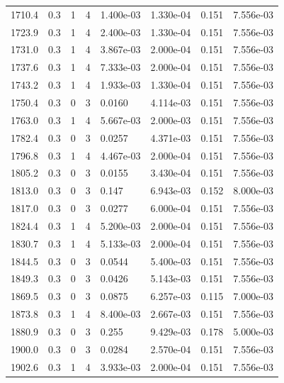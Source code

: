 \documentclass[preview]{standalone}
\begin{document}
{{{{{{\begin{tabular}{L{1.2cm}C{1.2cm} C{0.3cm}C{0.5cm} C{1.4cm}C{1.4cm} C{1.4cm}C{1.4cm}}
  1710.4  &   0.3  & 1     &  4 &  1.400e-03  & 1.330e-04  & 0.151 &  7.556e-03   \\ 
  1723.9  &   0.3  & 1     &  4 &  2.400e-03  & 1.330e-04  & 0.151 &  7.556e-03   \\ 
  1731.0  &   0.3  & 1     &  4 &  3.867e-03  & 2.000e-04  & 0.151 &  7.556e-03   \\ 
  1737.6  &   0.3  & 1     &  4 &  7.333e-03  & 2.000e-04  & 0.151 &  7.556e-03   \\ 
  1743.2  &   0.3  & 1     &  4 &  1.933e-03  & 1.330e-04  & 0.151 &  7.556e-03   \\ 
  1750.4  &   0.3  & 0     &  3 &  0.0160  & 4.114e-03  & 0.151 &  7.556e-03   \\ 
  1763.0  &   0.3  & 1     &  4 &  5.667e-03  & 2.000e-03  & 0.151 &  7.556e-03   \\ 
  1782.4  &   0.3  & 0     &  3 &  0.0257  & 4.371e-03  & 0.151 &  7.556e-03   \\ 
  1796.8  &   0.3  & 1     &  4 &  4.467e-03  & 2.000e-04  & 0.151 &  7.556e-03   \\ 
  1805.2  &   0.3  & 0     &  3 &  0.0155  & 3.430e-04  & 0.151 &  7.556e-03   \\ 
  1813.0  &   0.3  & 0     &  3 &  0.147  & 6.943e-03  & 0.152 &  8.000e-03   \\ 
  1817.0  &   0.3  & 0     &  3 &  0.0277  & 6.000e-04  & 0.151 &  7.556e-03   \\ 
  1824.4  &   0.3  & 1     &  4 &  5.200e-03  & 2.000e-04  & 0.151 &  7.556e-03   \\ 
  1830.7  &   0.3  & 1     &  4 &  5.133e-03  & 2.000e-04  & 0.151 &  7.556e-03   \\ 
  1844.5  &   0.3  & 0     &  3 &  0.0544  & 5.400e-03  & 0.151 &  7.556e-03   \\ 
  1849.3  &   0.3  & 0     &  3 &  0.0426  & 5.143e-03  & 0.151 &  7.556e-03   \\ 
  1869.5  &   0.3  & 0     &  3 &  0.0875  & 6.257e-03  & 0.115 &  7.000e-03   \\ 
  1873.8  &   0.3  & 1     &  4 &  8.400e-03  & 2.667e-03  & 0.151 &  7.556e-03   \\ 
  1880.9  &   0.3  & 0     &  3 &  0.255  & 9.429e-03  & 0.178 &  5.000e-03   \\ 
  1900.0  &   0.3  & 0     &  3 &  0.0284  & 2.570e-04  & 0.151 &  7.556e-03   \\ 
  1902.6  &   0.3  & 1     &  4 &  3.933e-03  & 2.000e-04  & 0.151 &  7.556e-03   \\ 

\end{tabular}}}}}}}
\end{document}
